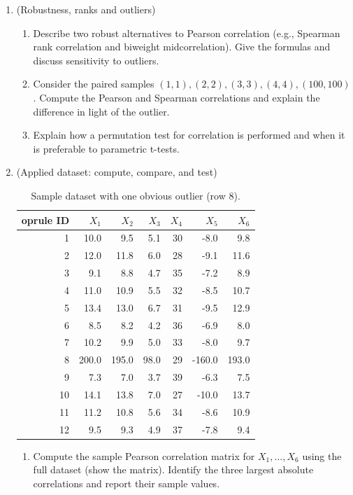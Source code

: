 \documentclass[12pt,a4paper]{article}
\begin{document}
\begin{enumerate}[label=(\arabic*)]
\item (Robustness, ranks and outliers)
    \begin{enumerate}[label=(\alph*)]
    \item Describe two robust alternatives to Pearson correlation (e.g., Spearman rank correlation and biweight midcorrelation). Give the formulas and discuss sensitivity to outliers.
    \item Consider the paired samples \((1,1),(2,2),(3,3),(4,4),(100,100)\). Compute the Pearson and Spearman correlations and explain the difference in light of the outlier.
    \item Explain how a permutation test for correlation is performed and when it is preferable to parametric t-tests.
    \end{enumerate}

\item (Applied dataset: compute, compare, and test)
    \begin{table}[H]
    \centering
    \begin{tabular}{rrrrrrr}
    	oprule
    ID & $X_1$ & $X_2$ & $X_3$ & $X_4$ & $X_5$ & $X_6$ \\
    \midrule
    1 & 10.0 & 9.5 & 5.1 & 30 & -8.0 & 9.8 \\
    2 & 12.0 & 11.8 & 6.0 & 28 & -9.1 & 11.6 \\
    3 & 9.1 & 8.8 & 4.7 & 35 & -7.2 & 8.9 \\
    4 & 11.0 & 10.9 & 5.5 & 32 & -8.5 & 10.7 \\
    5 & 13.4 & 13.0 & 6.7 & 31 & -9.5 & 12.9 \\
    6 & 8.5 & 8.2 & 4.2 & 36 & -6.9 & 8.0 \\
    7 & 10.2 & 9.9 & 5.0 & 33 & -8.0 & 9.7 \\
    8 & 200.0 & 195.0 & 98.0 & 29 & -160.0 & 193.0 \\
    9 & 7.3 & 7.0 & 3.7 & 39 & -6.3 & 7.5 \\
    10 & 14.1 & 13.8 & 7.0 & 27 & -10.0 & 13.7 \\
    11 & 11.2 & 10.8 & 5.6 & 34 & -8.6 & 10.9 \\
    12 & 9.5 & 9.3 & 4.9 & 37 & -7.8 & 9.4 \\
    \bottomrule
    \end{tabular}
    \caption{Sample dataset with one obvious outlier (row 8).}
    \end{table}
    \begin{enumerate}[label=(\alph*)]
    \item Compute the sample Pearson correlation matrix for \(X_1,\dots,X_6\) using the full dataset (show the matrix). Identify the three largest absolute correlations and report their sample values.

\end{enumerate}
\end{enumerate}
\end{document}
